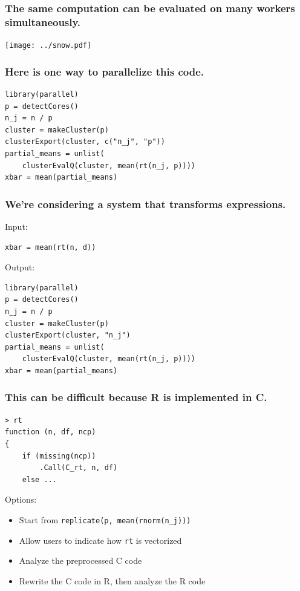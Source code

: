 \documentclass{beamer}
\begin{document}
\begin{frame}

    \frametitle{The same computation can be evaluated on many workers
    simultaneously.}

\centerline{\texttt{[image: ../snow.pdf]}}

\end{frame}
\begin{frame}[fragile]

    \frametitle{Here is one way to parallelize this code.}

\begin{verbatim}
library(parallel)
p = detectCores()
n_j = n / p
cluster = makeCluster(p)
clusterExport(cluster, c("n_j", "p"))
partial_means = unlist(
    clusterEvalQ(cluster, mean(rt(n_j, p))))
xbar = mean(partial_means)
\end{verbatim}

\end{frame}
\begin{frame}[fragile]

    \frametitle{We're considering a system that transforms expressions.}

    Input:

\begin{verbatim}
xbar = mean(rt(n, d))
\end{verbatim}

    Output:

\begin{verbatim}
library(parallel)
p = detectCores()
n_j = n / p
cluster = makeCluster(p)
clusterExport(cluster, "n_j")
partial_means = unlist(
    clusterEvalQ(cluster, mean(rt(n_j, p))))
xbar = mean(partial_means)
\end{verbatim}

\end{frame}
\begin{frame}[fragile]

    \frametitle{This can be difficult because R is implemented in C.}

\begin{verbatim}
> rt
function (n, df, ncp)
{
    if (missing(ncp))
        .Call(C_rt, n, df)
    else ...
\end{verbatim}

    Options:

    \begin{itemize}
        \item Start from \texttt{replicate(p, mean(rnorm(n\_j)))}
        \item Allow users to indicate how \texttt{rt} is vectorized
        \item Analyze the preprocessed C code
        \item Rewrite the C code in R, then analyze the R code
    \end{itemize}

\end{frame}
\end{document}
